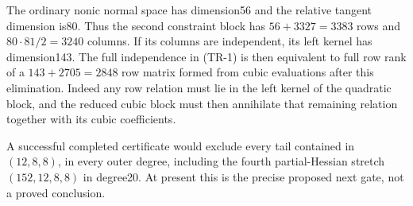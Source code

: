 The ordinary nonic normal space has dimension56 and the relative
tangent dimension is80. Thus the second constraint block has
$56+3327=3383$ rows and $80\cdot81/2=3240$ columns. If its columns
are independent, its left kernel has dimension143. The full
independence in (TR-1) is then equivalent to full row rank of a
$143+2705=2848$ row matrix formed from cubic evaluations after
this elimination. Indeed any row relation must lie in the left
kernel of the quadratic block, and the reduced cubic block must
then annihilate that remaining relation together with its cubic
coefficients.

A successful completed certificate would exclude every tail contained
in $(12,8,8)$, in every outer degree, including the fourth
partial-Hessian stretch $(152,12,8,8)$ in degree20. At present this
is the precise proposed next gate, not a proved conclusion.
